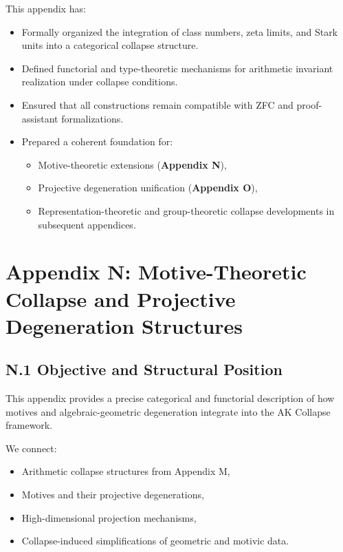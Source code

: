 \documentclass[11pt]{article}
\begin{document}
This appendix has:
\begin{itemize}
  \item Formally organized the integration of class numbers, zeta limits, and Stark units into a categorical collapse structure.
  \item Defined functorial and type-theoretic mechanisms for arithmetic invariant realization under collapse conditions.
  \item Ensured that all constructions remain compatible with ZFC and proof-assistant formalizations.
  \item Prepared a coherent foundation for:
  \begin{itemize}
    \item Motive-theoretic extensions (\textbf{Appendix N}),
    \item Projective degeneration unification (\textbf{Appendix O}),
    \item Representation-theoretic and group-theoretic collapse developments in subsequent appendices.
  \end{itemize}
\end{itemize}





\section*{Appendix N: Motive-Theoretic Collapse and Projective Degeneration Structures}

\subsection*{N.1 Objective and Structural Position}

This appendix provides a precise categorical and functorial description of how motives and algebraic-geometric degeneration integrate into the AK Collapse framework.  

We connect:
\begin{itemize}
  \item Arithmetic collapse structures from Appendix M,
  \item Motives and their projective degenerations,
  \item High-dimensional projection mechanisms,
  \item Collapse-induced simplifications of geometric and motivic data.
\end{itemize}
\end{document}
